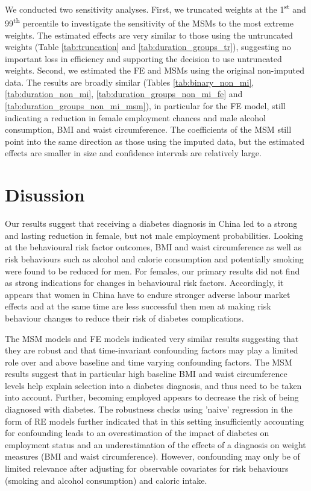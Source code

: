We conducted two sensitivity analyses. First, we truncated weights at the 1\textsuperscript{st} and 99\textsuperscript{th} percentile to investigate the sensitivity of the \acp{MSM} to the most extreme weights. The estimated effects are very similar to those using the untruncated weights (Table \ref{tab:truncation} and \ref{tab:duration_groups_tr}), suggesting no important loss in efficiency and supporting the decision to use untruncated weights. Second, we estimated the \ac{FE} and \acp{MSM} using the original non-imputed data. The results are broadly similar (Tables \ref{tab:binary_non_mi}, \ref{tab:duration_non_mi}, \ref{tab:duration_groups_non_mi_fe} and \ref{tab:duration_groups_non_mi_msm}), in particular for the \ac{FE} model, still indicating a reduction in female employment chances and male alcohol consumption, \ac{BMI} and waist circumference. The coefficients of the \ac{MSM} still point into the same direction as those using the imputed data, but the estimated effects are smaller in size and confidence intervals are relatively large.


\FloatBarrier


\section{\label{sec:Discussion5}Disussion}

Our results suggest that receiving a diabetes diagnosis in China led to a strong and lasting reduction in female, but not male employment probabilities. Looking at the behavioural risk factor outcomes, \ac{BMI} and waist circumference as well as risk behaviours such as alcohol and calorie consumption and potentially smoking were found to be reduced for men. For females, our primary results did not find as strong indications for changes in behavioural risk factors. Accordingly, it appears that women in China have to endure stronger adverse labour market effects and at the same time are less successful then men at making risk behaviour changes to reduce their risk of diabetes complications.

The \ac{MSM} models and \ac{FE} models indicated very similar results suggesting that they are robust and that time-invariant confounding factors may play a limited role over and above baseline and time varying confounding factors. The \ac{MSM} results suggest that in particular high baseline \ac{BMI} and waist circumference levels help explain selection into a diabetes diagnosis, and thus need to be taken into account. Further, becoming employed appears to decrease the risk of being diagnosed with diabetes. The robustness checks using 'naive' regression in the form of \ac{RE} models further indicated that in this setting insufficiently accounting for confounding leads to an overestimation of the impact of diabetes on employment status and an underestimation of the effects of a diagnosis on weight measures (\ac{BMI} and waist circumference). However, confounding may only be of limited relevance after adjusting for observable covariates for risk behaviours (smoking and alcohol consumption) and caloric intake.

